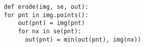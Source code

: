 \documentclass[varwidth=5cm, border={0.1cm 0.1cm 0.1cm 0.1cm}]{standalone}
\begin{document}
\begin{verbatim}
def erode(img, se, out):
for pnt in img.points():
    out(pnt) = img(pnt)
    for nx in se(pnt):
      out(pnt) = min(out(pnt), img(nx))
\end{verbatim}
\end{document}
